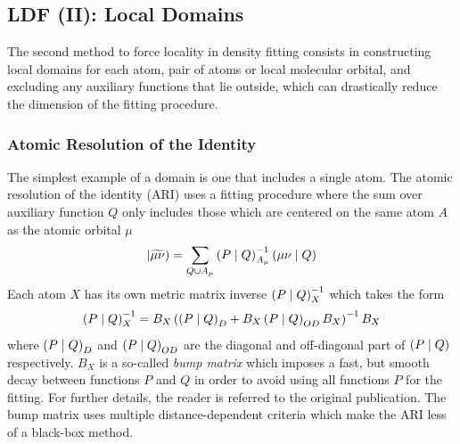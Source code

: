 

\subsection{LDF (II): Local Domains}

The second method to force locality in density fitting consists in constructing local domains for each atom, pair of atoms or local molecular orbital, and excluding any auxiliary functions that lie outside, which can drastically reduce the dimension of the fitting procedure. 

\subsubsection{Atomic Resolution of the Identity}

The simplest example of a domain is one that includes a single atom. The atomic resolution of the identity (ARI) \cite{Sod2008} uses a fitting procedure where the sum over auxiliary function $Q$ only includes those which are centered on the same atom $A$ as the atomic orbital $\mu$
\begin{equation}
\left\lvert \widetilde{\mu\nu} \right) = \sum_{Q \cup A_{\mu}} \left( P \mid Q \right)_{A_{\mu}}^{-1} \left( \mu\nu \mid Q \right)
\end{equation}
\noindent Each atom $X$ has its own metric matrix inverse $\left( P \mid Q \right)_X^{-1}$ which takes the form 
\begin{equation}
\left( P \mid Q \right)_X^{-1} = B_X \left( \left( P \mid Q \right)_D + B_X \left( P \mid Q \right)_{OD}B_X\right)^{-1}B_X
\end{equation}
\noindent where $\left( P \mid Q \right)_D$ and $\left( P \mid Q \right)_{OD}$ are the diagonal and off-diagonal part of $\left( P \mid Q \right)$ respectively. $B_X$ is a so-called \emph{bump matrix} which imposes a fast, but smooth decay between functions $P$ and $Q$ in order to avoid using all functions $P$ for the fitting. For further details, the reader is referred to the original publication. The bump matrix uses multiple distance-dependent criteria which make the ARI less of a black-box method.

